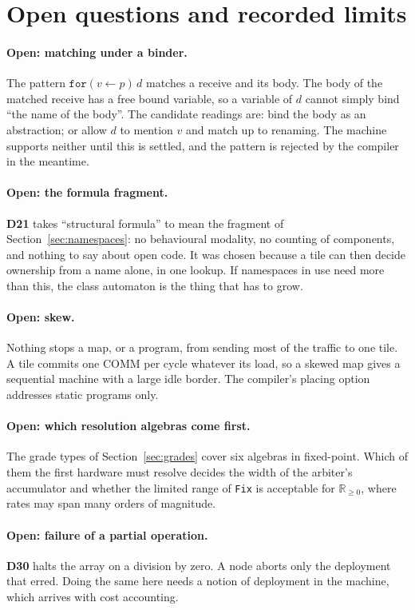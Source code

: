 \documentclass[10.5pt,a4paper]{extarticle}
\newcommand{\kw}[1]{\texttt{#1}}
\newcommand{\for}[3]{\kw{for}(#1 \leftarrow #2)\,#3}
\newcommand{\dec}[1]{\textbf{D#1}}
\theoremstyle{definition}
\theoremstyle{remark}
\begin{document}
\section{Open questions and recorded limits}\label{sec:open}

\paragraph{Open: matching under a binder.}
The pattern $\for{v}{p}{d}$ matches a receive and its body. The body of the
matched receive has a free bound variable, so a variable of $d$ cannot simply
bind ``the name of the body''. The candidate readings are: bind the body as
an abstraction; or allow $d$ to mention $v$ and match up to renaming. The
machine supports neither until this is settled, and the pattern is rejected
by the compiler in the meantime.

\paragraph{Open: the formula fragment.} \dec{21} takes ``structural
formula'' to mean the fragment of Section~\ref{sec:namespaces}: no
behavioural modality, no counting of components, and nothing to say about
open code. It was chosen because a tile can then decide ownership from a name
alone, in one lookup. If namespaces in use need more than this, the class
automaton is the thing that has to grow.

\paragraph{Open: skew.} Nothing stops a map, or a program, from sending most
of the traffic to one tile. A tile commits one COMM per cycle whatever its
load, so a skewed map gives a sequential machine with a large idle border.
The compiler's placing option addresses static programs only.

\paragraph{Open: which resolution algebras come first.} The grade types of
Section~\ref{sec:grades} cover six algebras in fixed-point. Which of them
the first hardware must resolve decides the width of the arbiter's
accumulator and whether the limited range of \kw{Fix} is acceptable for
$\mathbb{R}_{\ge 0}$, where rates may span many orders of magnitude.

\paragraph{Open: failure of a partial operation.} \dec{30} halts the array on
a division by zero. A node aborts only the deployment that erred. Doing the
same here needs a notion of deployment in the machine, which arrives with
cost accounting.
\end{document}
